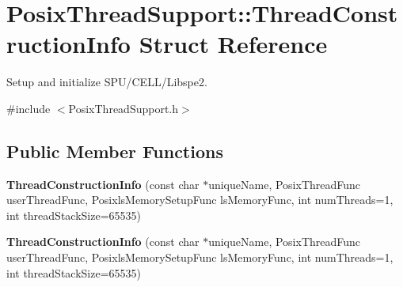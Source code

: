 \hypertarget{structPosixThreadSupport_1_1ThreadConstructionInfo}{}\section{Posix\+Thread\+Support\+:\+:Thread\+Construction\+Info Struct Reference}
\label{structPosixThreadSupport_1_1ThreadConstructionInfo}


Setup and initialize S\+P\+U/\+C\+E\+L\+L/\+Libspe2.  




{\ttfamily \#include $<$Posix\+Thread\+Support.\+h$>$}

\subsection*{Public Member Functions}
\begin{DoxyCompactItemize}
\item 
\mbox{\label{structPosixThreadSupport_1_1ThreadConstructionInfo_a6f493b246c04a3e269899d18123eeea8}} 
{\bfseries Thread\+Construction\+Info} (const char $\ast$unique\+Name, Posix\+Thread\+Func user\+Thread\+Func, Posixls\+Memory\+Setup\+Func ls\+Memory\+Func, int num\+Threads=1, int thread\+Stack\+Size=65535)
\item 
\mbox{\label{structPosixThreadSupport_1_1ThreadConstructionInfo_a6f493b246c04a3e269899d18123eeea8}} 
{\bfseries Thread\+Construction\+Info} (const char $\ast$unique\+Name, Posix\+Thread\+Func user\+Thread\+Func, Posixls\+Memory\+Setup\+Func ls\+Memory\+Func, int num\+Threads=1, int thread\+Stack\+Size=65535)
\end{DoxyCompactItemize}
